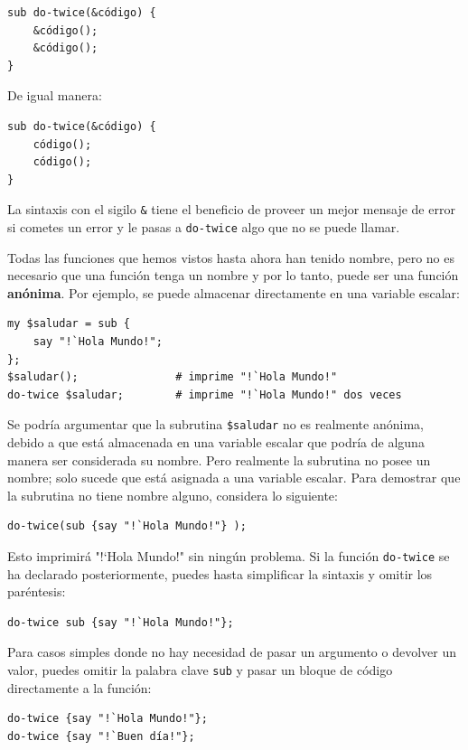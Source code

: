 \begin{lstlisting}
sub do-twice(&código) {
    &código(); 
    &código();
}
\end{lstlisting}

De igual manera:
\begin{lstlisting}
sub do-twice(&código) {
    código(); 
    código();
}
\end{lstlisting}

La sintaxis con el sigilo \verb|&| tiene el beneficio de
proveer un mejor mensaje de error si cometes un error y le pasas
a \verb|do-twice| algo que no se puede llamar. 

Todas las funciones que hemos vistos hasta ahora han tenido nombre,
pero no es necesario que una función tenga un nombre y por lo tanto,
puede ser una función {\bf anónima}. Por ejemplo, 
se puede almacenar directamente en una variable escalar:

\begin{lstlisting}
my $saludar = sub {
    say "!`Hola Mundo!";
};
$saludar();               # imprime "!`Hola Mundo!"
do-twice $saludar;        # imprime "!`Hola Mundo!" dos veces
\end{lstlisting}

Se podría argumentar que la subrutina \verb|$saludar| no es realmente
anónima, debido a que está almacenada en una variable escalar 
que podría de alguna manera ser considerada su nombre. Pero realmente
la subrutina no posee un nombre; solo sucede que está asignada a una
variable escalar. Para demostrar que la subrutina no tiene nombre 
alguno, considera lo siguiente:

\begin{lstlisting}
do-twice(sub {say "!`Hola Mundo!"} );
\end{lstlisting}

Esto imprimirá "!`Hola Mundo!" sin ningún problema. Si la función
\verb|do-twice| se ha declarado posteriormente, puedes hasta 
simplificar la sintaxis y omitir los paréntesis:

\begin{lstlisting}
do-twice sub {say "!`Hola Mundo!"};
\end{lstlisting}

Para casos simples donde no hay necesidad de pasar un argumento
o devolver un valor, puedes omitir la palabra clave \verb|sub|
y pasar un bloque de código directamente a la función:

\begin{lstlisting}
do-twice {say "!`Hola Mundo!"};
do-twice {say "!`Buen día!"};
\end{lstlisting}

